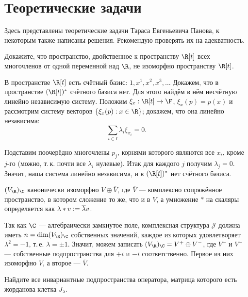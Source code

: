 \section{Теоретические задачи}

Здесь представлены теоретические задачи Тараса Евгеньевича Панова, к некоторым также написаны решения. Рекомендую проверять их на адекватность.

\begin{problem}
    Докажите, что пространство, двойственное к пространству $\R[t]$ всех многочленов от одной переменной над $\R$, не изоморфно пространству $\R[t]$.
\end{problem}

\begin{solution}
    В пространстве $\R[t]$ есть счётный базис: $1, x^1, x^2, x^3, \ldots$ Докажем, что в пространстве $(\R[t])^\ast$ счётного базиса нет. Для этого найдём в нём несчётную линейно независимую систему. Положим $\xi_x: \R[t] \to \F$, $\xi_x(p) = p(x)$ и рассмотрим систему векторов $\{\xi_x(p) : x \in \R\}$; докажем, что она линейно независима:
    \[
        \sum_{i \in I}\lambda_i\xi_{x_i} = 0.
    \]

    Подставим поочерёдно многочлены $p_j$, корнями которого являются все $x_i$, кроме $j$-го (можно, т.\,к. почти все $\lambda_i$ нулевые). Итак для каждого $j$ получим $\lambda_j = 0$. Значит, наша система линейно независима, и в $(\R[t])^\ast$ нет счётного базиса.
\end{solution}

\begin{problem}
    $(V_\R)_\C$ канонически изоморфно $V \oplus \overline{V}$, где $\overline{V}$ --- комплексно сопряжённое пространство, в котором сложение то же, что и в $V$, а умножение $\ast$ на скаляры определяется как $\lambda \ast v \vcentcolon = \overline{\lambda}v$.
\end{problem}

\begin{solution}
    Так как $\C$ --- алгебраически замкнутое поле, комплексная структура $\mathcal{J}$ должна иметь $n = \dim (V_\R)_\C$ собственных значений, каждое из которых удовлетворяет $\lambda^2 = -1$, т.\,е. $\lambda = \pm 1$. Значит, можем записать $(V_\R)_\C = V^+ \oplus V^-$, где $V^+$ и $V^-$ --- собственные подпространства для $+i$ и $-i$ соответственно. Первое из них изоморфно $V$, а второе --- $\overline{V}$.
\end{solution}

\begin{problem}
    Найдите все инвариантные подпространства оператора, матрица которого есть жорданова клетка $J_\lambda$.
\end{problem}

